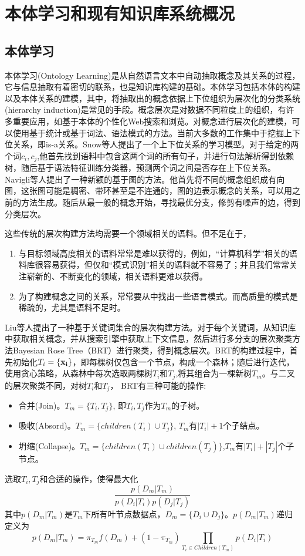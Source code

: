 \section{本体学习和现有知识库系统概况}
\subsection{本体学习}
本体学习(Ontology Learning)是从自然语言文本中自动抽取概念及其关系的过程，它与信息抽取有着密切的联系，也是知识库构建的基础。本体学习包括本体的构建以及本体关系的建模，其中，将抽取出的概念依据上下位组织为层次化的分类系统(hierarchy induction)是常见的手段。概念层次是对数据不同粒度上的组织，有许多重要应用，如基于本体的个性化Web搜索和浏览\cite{gauch2003ontology}。对概念进行层次化的建模，可以使用基于统计或基于词法、语法模式的方法。当前大多数的工作集中于挖掘上下位关系，即is-a关系。Snow等人\cite{snow2004learning}提出了一个上下位关系的学习模型。对于给定的两个词$c_i,c_j$,他首先找到语料中包含这两个词的所有句子，并进行句法解析得到依赖树，随后基于语法特征训练分类器，预测两个词之间是否存在上下位关系。Navigli等人\cite{navigli2011graph}提出了一种新颖的基于图的方法。他首先将不同的概念组织成有向图，这张图可能是稠密、带环甚至是不连通的，图的边表示概念的关系，可以用之前的方法生成。随后从最一般的概念开始，寻找最优分支，修剪有噪声的边，得到分类层次。

这些传统的层次构建方法均需要一个领域相关的语料。但不足在于，
\begin{enumerate}
\item 与目标领域高度相关的语料常常是难以获得的，例如，``计算机科学''相关的语料库很容易获得，但仅和``模式识别''相关的语料就不容易了；并且我们常常关注崭新的、不断变化的领域，相关语料更难以获得。
\item 为了构建概念之间的关系，常常要从中找出一些语言模式。而高质量的模式是稀疏的，尤其是语料不足时。
\end{enumerate}

Liu等人\cite{liu2012automatic}提出了一种基于关键词集合的层次构建方法。对于每个关键词，从知识库中获取相关概念，并从搜索引擎中获取上下文信息，然后进行多分支的层次聚类方法Bayesian Rose Tree（BRT）进行聚类，得到概念层次。BRT的构建过程中，首先初始化$T_i=\{\bf{x}_i\}$，即每棵树仅包含一个节点，构成一个森林；随后进行迭代，使用贪心策略，从森林中每次选取两棵树$T_i$和$T_j$,将其组合为一棵新树$T_m$。与二叉的层次聚类不同，对树$T_i$和$T_j$， BRT有三种可能的操作:
\begin{itemize}
\item 合并(Join)。$T_m=\{T_i, T_j\}$, 即$T_i, T_j$作为$T_m$的子树。
\item 吸收(Absord)。$T_m  = \{children(T_i) \cup T_j\}$, $T_m$有$|T_i|+1$个子结点。
\item 坍缩(Collapse)。$T_m = \{children(T_i)\cup children(T_j)\}$,$T_m$有$|T_i|+|T_j|$个子节点。
\end{itemize}
选取$T_i, T_j$和合适的操作，使得最大化
\[
\frac{p(D_m|T_m)}{p(D_i|T_i)p(D_j|T_j)}
\]
其中$p(D_m|T_m)$是$T_m$下所有叶节点数据点，$D_m=\{ D_i\cup D_j\}$。$p(D_m|T_m)$递归定义为
\[
p(D_m|T_m) = \pi_{T_m}f(D_m)+(1-\pi_{T_m}) \prod \limits_{{T_i} \in Children({T_m})} {p({D_i}|{T_i})} 
\]

